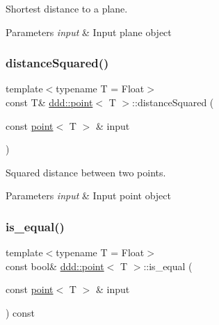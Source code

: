 Shortest distance to a plane. 


\begin{DoxyParams}{Parameters}
{\em input} & Input plane object \\
\hline
\end{DoxyParams}
\mbox{\label{classddd_1_1point_a58ef7bc4870110dfd05c00609357756c}} 
\subsubsection{\texorpdfstring{distance\+Squared()}{distanceSquared()}}
{\footnotesize\ttfamily template$<$typename T = Float$>$ \\
const T\& \hyperlink{classddd_1_1point}{ddd\+::point}$<$ T $>$\+::distance\+Squared (\begin{DoxyParamCaption}\item[{const \hyperlink{classddd_1_1point}{point}$<$ T $>$ \&}]{input }\end{DoxyParamCaption})\hspace{0.3cm}{\ttfamily [inline]}}



Squared distance between two points. 


\begin{DoxyParams}{Parameters}
{\em input} & Input point object \\
\hline
\end{DoxyParams}
\mbox{\label{classddd_1_1point_ac18ef1f91134bce9bcfe8d8419ab0f2b}} 
\subsubsection{\texorpdfstring{is\+\_\+equal()}{is\_equal()}}
{\footnotesize\ttfamily template$<$typename T = Float$>$ \\
const bool\& \hyperlink{classddd_1_1point}{ddd\+::point}$<$ T $>$\+::is\+\_\+equal (\begin{DoxyParamCaption}\item[{const \hyperlink{classddd_1_1point}{point}$<$ T $>$ \&}]{input }\end{DoxyParamCaption}) const\hspace{0.3cm}{\ttfamily [inline]}}



